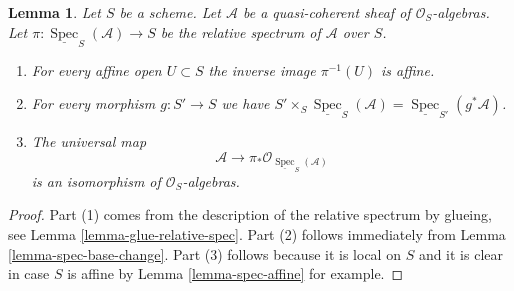\documentclass{stacks-project}
\theoremstyle{plain}
\newtheorem{lemma}[subsection]{Lemma}
\theoremstyle{definition}
\theoremstyle{remark}
\numberwithin{equation}{subsection}
\def\Spec{\mathop{\mathrm{Spec}}}
\begin{document}
\begin{lemma}
\label{lemma-spec-properties}
Let $S$ be a scheme. Let $\mathcal{A}$ be a quasi-coherent
sheaf of $\mathcal{O}_S$-algebras. Let
$\pi : \underline{\Spec}_S(\mathcal{A}) \to S$
be the relative spectrum of $\mathcal{A}$ over $S$.
\begin{enumerate}
\item For every affine open $U \subset S$ the inverse image
$\pi^{-1}(U)$ is affine.
\item For every morphism $g : S' \to S$ we have
$S' \times_S \underline{\Spec}_S(\mathcal{A}) =
\underline{\Spec}_{S'}(g^*\mathcal{A})$.
\item
The universal map
$$
\mathcal{A}
\longrightarrow
\pi_*\mathcal{O}_{\underline{\Spec}_S(\mathcal{A})}
$$
is an isomorphism of $\mathcal{O}_S$-algebras.
\end{enumerate}
\end{lemma}

\begin{proof}
Part (1) comes from the description of the relative spectrum
by glueing, see Lemma \ref{lemma-glue-relative-spec}.
Part (2) follows immediately from Lemma \ref{lemma-spec-base-change}.
Part (3) follows because it is local on $S$ and it is clear in case $S$
is affine by Lemma \ref{lemma-spec-affine} for example.
\end{proof}
\end{document}
